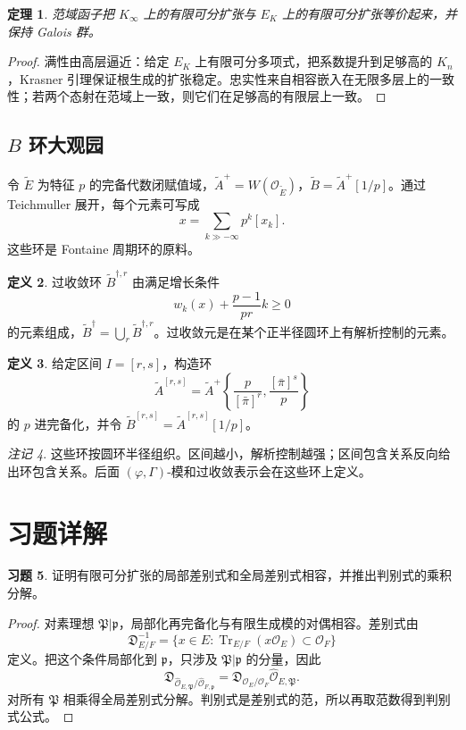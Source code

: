 \documentclass[11pt,a4paper,openany]{ctexbook}
\numberwithin{equation}{chapter}
\theoremstyle{plain}
\newtheorem{theorem}{定理}[chapter]
\theoremstyle{definition}
\newtheorem{definition}[theorem]{定义}
\newtheorem{exercise}[theorem]{习题}
\theoremstyle{remark}
\newtheorem{remark}[theorem]{注记}
\begin{document}
\begin{theorem}
范域函子把 $K_\infty$ 上的有限可分扩张与 $E_K$ 上的有限可分扩张等价起来，并保持 Galois 群。
\end{theorem}

\begin{proof}
满性由高层逼近：给定 $E_K$ 上有限可分多项式，把系数提升到足够高的 $K_n$，Krasner 引理保证根生成的扩张稳定。忠实性来自相容嵌入在无限多层上的一致性；若两个态射在范域上一致，则它们在足够高的有限层上一致。
\end{proof}

\subsection{\texorpdfstring{$B$ 环大观园}{B 环大观园}}

令 $\widetilde E$ 为特征 $p$ 的完备代数闭赋值域，$\widetilde A^+=W(\mathcal O_{\widetilde E})$，$\widetilde B=\widetilde A^+[1/p]$。通过 Teichmuller 展开，每个元素可写成
\[
  x=\sum_{k\gg-\infty}p^k[x_k].
\]
这些环是 Fontaine 周期环的原料。

\begin{definition}
过收敛环 $\widetilde B^{\dagger,r}$ 由满足增长条件
\[
  w_k(x)+\frac{p-1}{pr}k\ge0
\]
的元素组成，$\widetilde B^\dagger=\bigcup_r\widetilde B^{\dagger,r}$。过收敛元是在某个正半径圆环上有解析控制的元素。
\end{definition}

\begin{definition}
给定区间 $I=[r,s]$，构造环
\[
  \widetilde A^{[r,s]}=\widetilde A^+\left\{\frac p{[\bar\pi]^r},\frac{[\bar\pi]^s}p\right\}
\]
的 $p$ 进完备化，并令 $\widetilde B^{[r,s]}=\widetilde A^{[r,s]}[1/p]$。
\end{definition}

\begin{remark}
这些环按圆环半径组织。区间越小，解析控制越强；区间包含关系反向给出环包含关系。后面 $(\varphi,\Gamma)$-模和过收敛表示会在这些环上定义。
\end{remark}

\section{习题详解}

\begin{exercise}
证明有限可分扩张的局部差别式和全局差别式相容，并推出判别式的乘积分解。
\end{exercise}

\begin{proof}
对素理想 $\mathfrak P|\mathfrak p$，局部化再完备化与有限生成模的对偶相容。差别式由
\[
  \mathfrak D^{-1}_{E/F}=\{x\in E:\operatorname{Tr}_{E/F}(x\mathcal O_E)\subset\mathcal O_F\}
\]
定义。把这个条件局部化到 $\mathfrak p$，只涉及 $\mathfrak P|\mathfrak p$ 的分量，因此
\[
  \mathfrak D_{\widehat{\mathcal O}_{E,\mathfrak P}/\widehat{\mathcal O}_{F,\mathfrak p}}
  =\mathfrak D_{\mathcal O_E/\mathcal O_F}\widehat{\mathcal O}_{E,\mathfrak P}.
\]
对所有 $\mathfrak P$ 相乘得全局差别式分解。判别式是差别式的范，所以再取范数得到判别式公式。
\end{proof}
\end{document}
